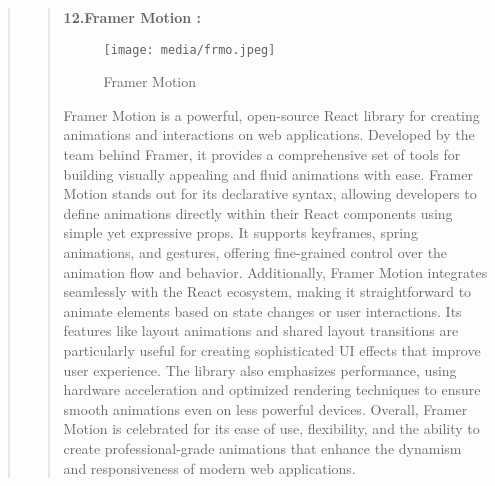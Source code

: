 \documentclass[12pt]{report}
\begin{document}
\begin{quote}
		\begin{quote}
			\textbf{12.Framer Motion :}\\
			\begin{figure}
				\centering
				\texttt{[image: media/frmo.jpeg]}\\
				\caption{Framer Motion}
			\end{figure}
			
			Framer Motion is a powerful, open-source React library for creating animations and interactions on web applications. Developed by the team behind Framer, it provides a comprehensive set of tools for building visually appealing and fluid animations with ease. Framer Motion stands out for its declarative syntax, allowing developers to define animations directly within their React components using simple yet expressive props. It supports keyframes, spring animations, and gestures, offering fine-grained control over the animation flow and behavior. Additionally, Framer Motion integrates seamlessly with the React ecosystem, making it straightforward to animate elements based on state changes or user interactions. Its features like layout animations and shared layout transitions are particularly useful for creating sophisticated UI effects that improve user experience. The library also emphasizes performance, using hardware acceleration and optimized rendering techniques to ensure smooth animations even on less powerful devices. Overall, Framer Motion is celebrated for its ease of use, flexibility, and the ability to create professional-grade animations that enhance the dynamism and responsiveness of modern web applications.
		\end{quote}
		
	\end{quote}
	\clearpage
	
\end{document}
